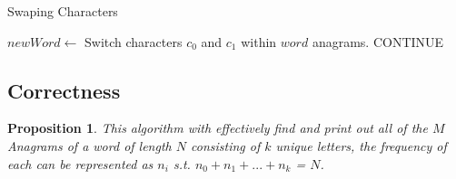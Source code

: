 \documentclass[12pt]{article}
\newtheorem{proposition}[theorem]{Proposition}
\begin{document}
\begin{algorithm}[H]
\caption{Swaping Characters}
\begin{algorithmic}
        \State $newWord \gets$ Switch characters $c_0$ and $c_1$ within $word$
            \State anagrams.
        \EndIf
        \State {}
                    \State CONTINUE
                \Else
                    \State {}
                \EndIf
            \EndFor
        \EndFor
    \EndProcedure
\end{algorithmic}
\end{algorithm}


\subsection{Correctness}

\begin{proposition}
This algorithm with effectively find and print out all of the $M$ Anagrams of a word of length $N$ consisting
of $k$ unique letters, the frequency of each can be represented as $n_i$ s.t. $n_0+n_1+...+n_k$ = $N$.
\end{proposition}
\end{document}
